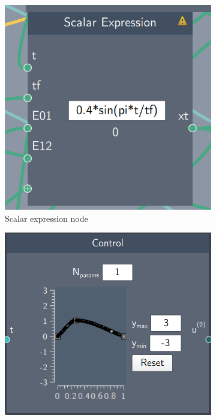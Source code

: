 \documentclass[a4paper, twocolumn]{revtex4-1}
\begin{document}
\begin{figure}[h]
	\begin{subfigure}[b]{0.4\columnwidth}
		\centering
		\includegraphics[width=\columnwidth]{graphics/composerScreens/ScalarExpressionNode.png}
		\caption{Scalar expression node}
	\end{subfigure}
	\hfill
	\begin{subfigure}[b]{0.45\columnwidth}
		\centering
		\includegraphics[width=\columnwidth]{graphics/composerScreens/ControlNode.png}

\end{subfigure}
\end{figure}
\end{document}
